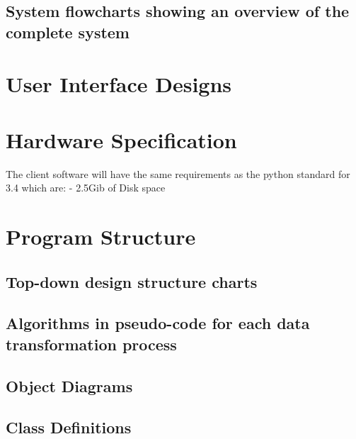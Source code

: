 \subsection{System flowcharts showing an overview of the complete system}

\section{User Interface Designs}
	

\section{Hardware Specification}
	The client software will have the same requirements as the python standard for 3.4 which are:
	- 2.5Gib of Disk space


\section{Program Structure}

\subsection{Top-down design structure charts}


\subsection{Algorithms in pseudo-code for each data transformation process}


\subsection{Object Diagrams}

    \begin{figure}[H]
    \end{figure}

\subsection{Class Definitions}

